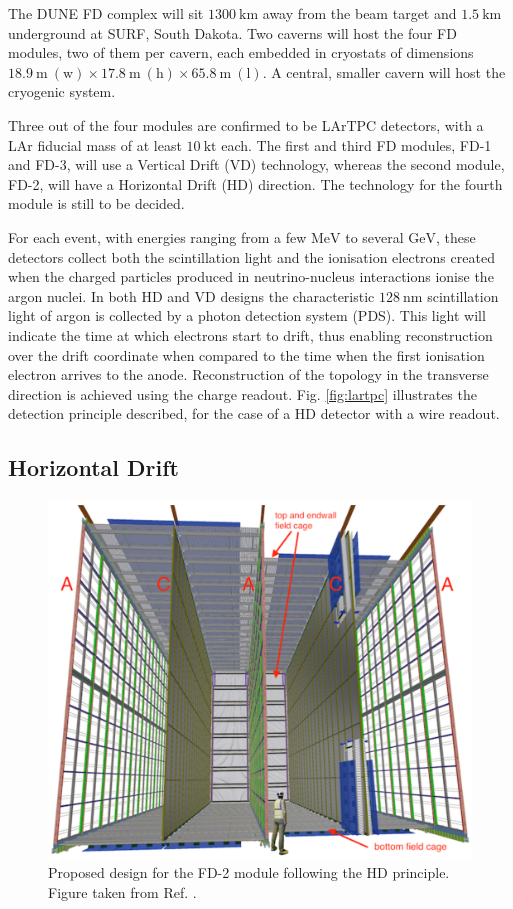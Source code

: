 The DUNE FD complex will sit $1300~\mathrm{km}$ away from the beam target and $1.5~\mathrm{km}$ underground at SURF, South Dakota. Two caverns will host the four FD modules, two of them per cavern, each embedded in cryostats of dimensions $18.9~\mathrm{m} ~ (\text{w}) \times 17.8~\mathrm{m} ~ (\text{h}) \times 65.8~\mathrm{m} ~ (\text{l})$. A central, smaller cavern will host the cryogenic system.

Three out of the four modules are confirmed to be LArTPC detectors, with a LAr fiducial mass of at least $10 ~ \mathrm{kt}$ each. The first and third FD modules, FD-1 and FD-3, will use a Vertical Drift (VD) technology, whereas the second module, FD-2, will have a Horizontal Drift (HD) direction. The technology for the fourth module is still to be decided.

For each event, with energies ranging from a few $\mathrm{MeV}$ to several $\mathrm{GeV}$, these detectors collect both the scintillation light and the ionisation electrons created when the charged particles produced in neutrino-nucleus interactions ionise the argon nuclei. In both HD and VD designs the characteristic $128~\mathrm{nm}$ scintillation light of argon is collected by a photon detection system (PDS). This light will indicate the time at which electrons start to drift, thus enabling reconstruction over the drift coordinate when compared to the time when the first ionisation electron arrives to the anode. Reconstruction of the topology in the transverse direction is achieved using the charge readout. Fig. \ref{fig:lartpc} illustrates the detection principle described, for the case of a HD detector with a wire readout.

\subsection{Horizontal Drift}

\begin{figure}[t]
	\centering
	\includegraphics[width=0.65\linewidth]{Images/DUNE/FD/dune_hd}
	\caption[Proposed design for the FD-2 module following the HD principle.]{Proposed design for the FD-2 module following the HD principle. Figure taken from Ref. \cite{DUNE2020TDR1}.}
	\label{fig:dune_hd}
\end{figure}

